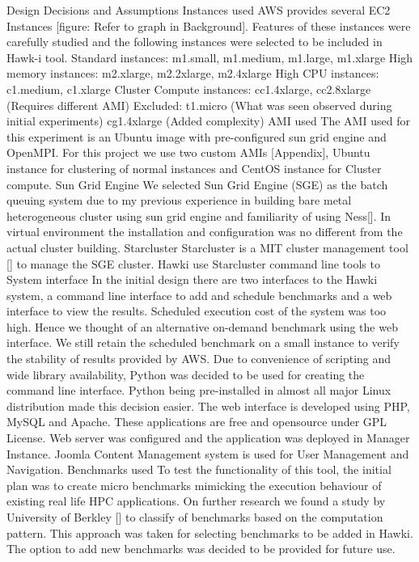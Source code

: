 \documentclass[12pt,a4paper]{report}
\begin{document}
Design Decisions and Assumptions
Instances used
AWS provides several EC2 Instances [figure: Refer to graph in Background]. Features of these instances were carefully studied and the following instances were selected to be included in Hawk-i tool. 
Standard instances: m1.small, m1.medium, m1.large, m1.xlarge
High memory instances: m2.xlarge, m2.2xlarge, m2.4xlarge
High CPU instances: c1.medium, c1.xlarge
Cluster Compute instances: cc1.4xlarge, cc2.8xlarge (Requires different AMI)
Excluded: 
t1.micro (What was seen observed during initial experiments)
cg1.4xlarge (Added complexity)
AMI used
The AMI used for this experiment is an Ubuntu image with pre-configured sun grid engine and OpenMPI.  For this project we use two custom AMIs [Appendix], Ubuntu instance for clustering of normal instances and CentOS instance for Cluster compute.
Sun Grid Engine
We selected Sun Grid Engine (SGE) as the batch queuing system due to my previous experience in building bare metal heterogeneous cluster using sun grid engine and familiarity of using Ness[]. In virtual environment the installation and configuration was no different from the actual cluster building.
Starcluster
Starcluster is a MIT cluster management tool [] to manage the SGE cluster. Hawki use Starcluster command line tools to    
System interface
In the initial design there are two interfaces to the Hawki system, a command line interface to add and schedule benchmarks and a web interface to view the results. Scheduled execution cost of the system was too high. Hence we thought of an alternative on-demand benchmark using the web interface. We still retain the scheduled benchmark on a small instance to verify the stability of results provided by AWS.
Due to convenience of scripting and wide library availability, Python was decided to be used for creating the command line interface. Python being pre-installed in almost all major Linux distribution made this decision easier.
The web interface is developed using PHP, MySQL and Apache. These applications are free and opensource under GPL License.  Web server was configured and the application was deployed in Manager Instance. Joomla Content Management system is used for User Management and Navigation. 
Benchmarks used
To test the functionality of this tool, the initial plan was to create micro benchmarks mimicking the execution behaviour of existing real life HPC applications. On further research we found a study by University of Berkley [] to classify of benchmarks based on the computation pattern. This approach was taken for selecting benchmarks to be added in Hawki. The option to add new benchmarks was decided to be provided for future use.
\end{document}
